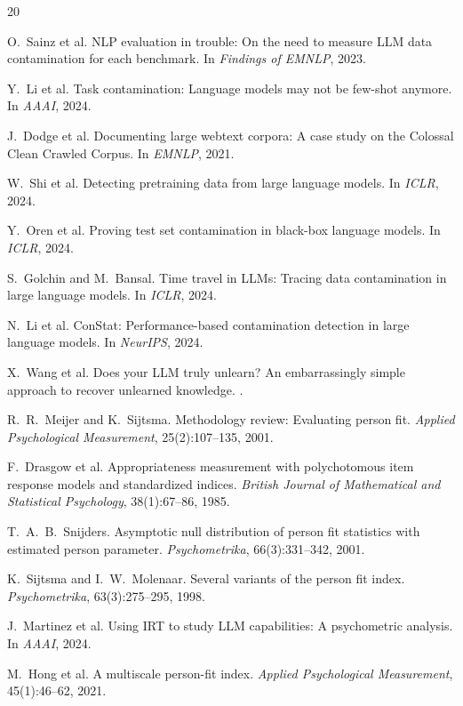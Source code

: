 \documentclass[11pt,a4paper]{article}
\begin{document}
\begin{thebibliography}{20}

O.~Sainz et al.
\newblock NLP evaluation in trouble: On the need to measure LLM data contamination for each benchmark.
\newblock In \emph{Findings of EMNLP}, 2023.

Y.~Li et al.
\newblock Task contamination: Language models may not be few-shot anymore.
\newblock In \emph{AAAI}, 2024.

J.~Dodge et al.
\newblock Documenting large webtext corpora: A case study on the Colossal Clean Crawled Corpus.
\newblock In \emph{EMNLP}, 2021.

W.~Shi et al.
\newblock Detecting pretraining data from large language models.
\newblock In \emph{ICLR}, 2024.

Y.~Oren et al.
\newblock Proving test set contamination in black-box language models.
\newblock In \emph{ICLR}, 2024.

S.~Golchin and M.~Bansal.
\newblock Time travel in LLMs: Tracing data contamination in large language models.
\newblock In \emph{ICLR}, 2024.

N.~Li et al.
\newblock ConStat: Performance-based contamination detection in large language models.
\newblock In \emph{NeurIPS}, 2024.

X.~Wang et al.
\newblock Does your LLM truly unlearn? An embarrassingly simple approach to recover unlearned knowledge.
.

R.~R.~Meijer and K.~Sijtsma.
\newblock Methodology review: Evaluating person fit.
\newblock \emph{Applied Psychological Measurement}, 25(2):107--135, 2001.

F.~Drasgow et al.
\newblock Appropriateness measurement with polychotomous item response models and standardized indices.
\newblock \emph{British Journal of Mathematical and Statistical Psychology}, 38(1):67--86, 1985.

T.~A.~B.~Snijders.
\newblock Asymptotic null distribution of person fit statistics with estimated person parameter.
\newblock \emph{Psychometrika}, 66(3):331--342, 2001.

K.~Sijtsma and I.~W.~Molenaar.
\newblock Several variants of the person fit index.
\newblock \emph{Psychometrika}, 63(3):275--295, 1998.

J.~Martinez et al.
\newblock Using IRT to study LLM capabilities: A psychometric analysis.
\newblock In \emph{AAAI}, 2024.

M.~Hong et al.
\newblock A multiscale person-fit index.
\newblock \emph{Applied Psychological Measurement}, 45(1):46--62, 2021.

\end{thebibliography}
\end{document}
